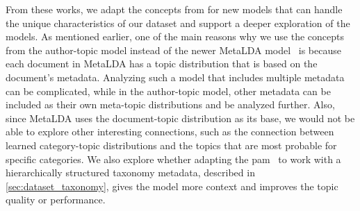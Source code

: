 From these works, we adapt the concepts from \citet{author_topic_2012} for new models that can handle the unique characteristics of our dataset and support a deeper exploration of the models.
As mentioned earlier, one of the main reasons why we use the concepts from the author-topic model instead of the newer MetaLDA model~\cite{MetaLDA2017} is because each document in MetaLDA has a topic distribution that is based on the document's metadata.
Analyzing such a model that includes multiple metadata can be complicated, while in the author-topic model, other metadata can be included as their own meta-topic distributions and be analyzed further.
Also, since MetaLDA uses the document-topic distribution as its base, we would not be able to explore other interesting connections, such as the connection between learned category-topic distributions and the topics that are most probable for specific categories.
We also explore whether adapting the \gls{pam}~\cite{li2006pachinko} to work with a hierarchically structured taxonomy metadata, described in \autoref{sec:dataset_taxonomy}, gives the model more context and improves the topic quality or performance.

